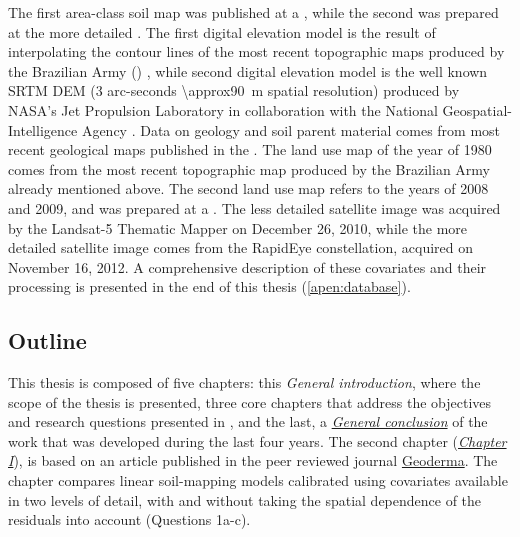 The first area-class soil map was published at a  \citep{AzolinEtAl1988}, while the 
second was prepared at the more detailed  \citep{MiguelEtAl2012}. The first digital 
elevation model is the result of interpolating the contour lines of the most recent topographic maps
produced by the Brazilian Army () \citep{DSG1980, DSG1992, DSG1992a}, while second 
digital elevation model is the well known SRTM DEM (3 arc-seconds \SI{\approx90}{\metre} spatial 
resolution) produced by NASA’s Jet Propulsion Laboratory in collaboration with the National 
Geospatial-Intelligence Agency \citep{RodriguezEtAl2006}. Data on geology and soil parent material 
comes from most recent geological maps published in the  \citep{MacielFilho1990,
GasparettoEtAl1988}. The land use map of the year of 1980 comes from the most recent topographic 
map produced by the Brazilian Army already mentioned above. The second land use map refers to the 
years of 2008 and 2009, and was prepared at a  \citep{SamuelRosaEtAl2011a}. The less 
detailed satellite image was acquired by the Landsat-5 Thematic Mapper on December 26, 2010, while
the more detailed satellite image comes from the RapidEye constellation, acquired on November 16, 
2012. A comprehensive description of these covariates and their processing is presented in the 
end of this thesis (\autoref{apen:database}).

\subsection{Outline}

This thesis is composed of five chapters: this \textit{General introduction}, where the scope of the
thesis is presented, three core chapters that address the objectives and research questions presented
in , and the last, a \hyperref[chap:conclusion]{\textit{General conclusion}}
of the work that was developed during the last four years. The second chapter 
(\hyperref[chap:chapter01]{\textit{Chapter I}}), is based on an article published in the peer 
reviewed journal \href{http://www.journals.elsevier.com/geoderma/}{Geoderma}. The chapter compares 
linear soil-mapping models calibrated using covariates available in two levels of detail, with and 
without taking the spatial dependence of the residuals into account (Questions 1a-c).

